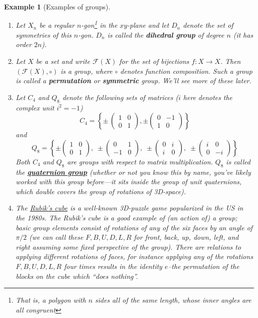 \documentclass[12pt]{article}
\numberwithin{equation}{subsection}
\theoremstyle{note}
\newtheorem{example}[subsection]{Example}
\begin{document}
\begin{example}[Examples of groups]
\begin{enumerate}
\item Let $X_n$ be a regular $n$-gon\footnote{That is, a polygon with $n$ sides all of the same length, whose inner angles are all congruent} in the $xy$-plane and let $D_n$ denote the set of symmetries of this $n$-gon. $D_n$ is called the \textbf{dihedral group} of degree $n$ (it has order $2n$). 

\item Let $X$ be a set and write $\mathcal{F}(X)$ for the set of bijections $f\colon X\to X$. Then $(\mathcal{F}(X),\circ)$ is a group, where $\circ$ denotes function composition. Such a group is called a \textbf{permutation} or \textbf{symmetric} group. We'll see more of these later.
\item \label{quats} Let $C_4$ and $Q_8$ denote the following sets of matrices ($i$ here denotes the complex unit $i^2=-1$) \begin{equation} C_4=\left\{ \pm \, \begin{pmatrix} 1 & 0 \\ 0 & 1 \end{pmatrix}, \pm \begin{pmatrix} 0 & -1 \\ 1 & 0\end{pmatrix}\right\} \end{equation} and \begin{equation} \label{q-8} Q_8=\left\{ \pm \begin{pmatrix} 1 & 0 \\ 0 & 1 \end{pmatrix}, \; \pm \begin{pmatrix} 0 & 1 \\ -1 & 0 \end{pmatrix}, \; \pm \begin{pmatrix} 0 & i \\ i & 0\end{pmatrix},\; \pm \begin{pmatrix} i & 0 \\ 0 & -i \end{pmatrix}\right\}\end{equation}
Both $C_4$ and $Q_8$ are groups with respect to matrix multiplication. $Q_8$ is called the \href{https://en.wikipedia.org/wiki/Quaternion_group}{\textbf{quaternion group}} (whether or not you know this by name, you've likely worked with this group before---it sits inside the group of \textit{unit quaternions}, which double covers the group of rotations of 3D-space).
\item The \href{https://en.wikipedia.org/wiki/Rubik's_Cube}{\textit{Rubik's cube}} is a well-known 3D-puzzle game popularized in the US in the 1980s. The Rubik's cube is a good example of (an action of) a group; basic group elements consist of rotations of any of the six faces by an angle of $\pi/2$ (we can call these $F,B,U,D,L,R$ for front, back, up, down, left, and right assuming some fixed perspective of the group). There are relations to applying different rotations of faces, for instance applying any of the rotations $F,B,U,D,L,R$ four times results in the identity $e$--the permutation of the blocks on the cube which ``does nothing''.

\end{enumerate}
\end{example}
\end{document}
